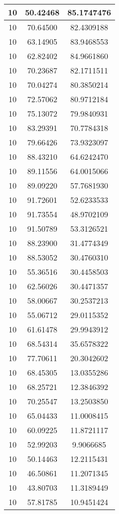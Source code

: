 \documentclass[
]{book}
\begin{document}
\begin{tabular}{c|c|c}
\hline
10 & 50.42468 & 85.1747476\\
\hline
10 & 70.64500 & 82.4309188\\
\hline
10 & 63.14905 & 83.9468553\\
\hline
10 & 62.82402 & 84.9661860\\
\hline
10 & 70.23687 & 82.1711511\\
\hline
10 & 70.04274 & 80.3850214\\
\hline
10 & 72.57062 & 80.9712184\\
\hline
10 & 75.13072 & 79.9840931\\
\hline
10 & 83.29391 & 70.7784318\\
\hline
10 & 79.66426 & 73.9323097\\
\hline
10 & 88.43210 & 64.6242470\\
\hline
10 & 89.11556 & 64.0015066\\
\hline
10 & 89.09220 & 57.7681930\\
\hline
10 & 91.72601 & 52.6233533\\
\hline
10 & 91.73554 & 48.9702109\\
\hline
10 & 91.50789 & 53.3126521\\
\hline
10 & 88.23900 & 31.4774349\\
\hline
10 & 88.53052 & 30.4760310\\
\hline
10 & 55.36516 & 30.4458503\\
\hline
10 & 62.56026 & 30.4471357\\
\hline
10 & 58.00667 & 30.2537213\\
\hline
10 & 55.06712 & 29.0115352\\
\hline
10 & 61.61478 & 29.9943912\\
\hline
10 & 68.54314 & 35.6578322\\
\hline
10 & 77.70611 & 20.3042602\\
\hline
10 & 68.45305 & 13.0355286\\
\hline
10 & 68.25721 & 12.3846392\\
\hline
10 & 70.25547 & 13.2503850\\
\hline
10 & 65.04433 & 11.0008415\\
\hline
10 & 60.09225 & 11.8721117\\
\hline
10 & 52.99203 & 9.9066685\\
\hline
10 & 50.14463 & 12.2115431\\
\hline
10 & 46.50861 & 11.2071345\\
\hline
10 & 43.80703 & 11.3189449\\
\hline
10 & 57.81785 & 10.9451424\\

\end{tabular}
\end{document}
